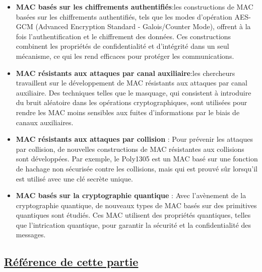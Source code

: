 \begin{itemize}[label=$\cdot$]
    \item \textbf{MAC basés sur les chiffrements authentifiés}:les constructions de MAC basées sur les chiffrements authentifiés, tels que les modes d'opération AES-GCM (Advanced Encryption Standard - Galois/Counter Mode), offrent à la fois l'authentification et le chiffrement des données. Ces constructions combinent les propriétés de confidentialité et d'intégrité dans un seul mécanisme, ce qui les rend efficaces pour protéger les communications.
    \item \textbf{MAC résistants aux attaques par canal auxiliaire}:les chercheurs travaillent sur le développement de MAC résistants aux attaques par canal auxiliaire. Des techniques telles que le masquage, qui consistent à introduire du bruit aléatoire dans les opérations cryptographiques, sont utilisées pour rendre les MAC moins sensibles aux fuites d'informations par le biais de canaux auxiliaires.
    \item \textbf{MAC résistants aux attaques par collision} : Pour prévenir les attaques par collision, de nouvelles constructions de MAC résistantes aux collisions sont développées. Par exemple, le Poly1305 est un MAC basé sur une fonction de hachage non sécurisée contre les collisions, mais qui est prouvé sûr lorsqu'il est utilisé avec une clé secrète unique.
    \item \textbf{MAC basés sur la cryptographie quantique} : Avec l'avènement de la cryptographie quantique, de nouveaux types de MAC basés sur des primitives quantiques sont étudiés. Ces MAC utilisent des propriétés quantiques, telles que l'intrication quantique, pour garantir la sécurité et la confidentialité des messages.
\end{itemize}

\subsection{\textbf{\underline{Référence de cette partie}}}
\begin{center}
    \cite{bellare2000new}\\
    \cite{dodis2005fuzzy}\\
    \cite{gennaro2004secure}\\
    \cite{bellare1996keying}\\
    \cite{wang2005finding}\\
\end{center}